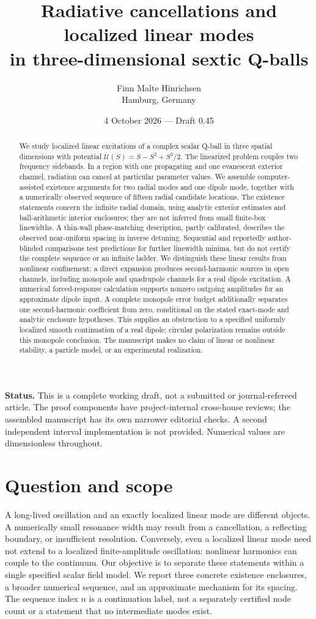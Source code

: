\documentclass[a4paper,11pt]{article}
\title{Radiative cancellations and localized linear modes\\in three-dimensional sextic Q-balls}
\author{Finn Malte Hinrichsen\\\small Hamburg, Germany}
\date{4 October 2026 --- Draft 0.45}
\begin{document}
\maketitle
\begin{abstract}
We study localized linear excitations of a complex scalar Q-ball in three
spatial dimensions with potential $\mathcal U(S)=S-S^2+S^3/2$.
The linearized problem couples two frequency sidebands. In a region with
one propagating and one evanescent exterior channel, radiation can cancel
at particular parameter values. We assemble computer-assisted existence
arguments for two radial modes and one dipole mode, together with a
numerically observed sequence of fifteen radial candidate locations.
The existence statements concern the infinite radial domain, using
analytic exterior estimates and ball-arithmetic interior enclosures;
they are not inferred from small finite-box linewidths. A thin-wall
phase-matching description, partly calibrated, describes the observed near-uniform
spacing in inverse detuning. Sequential and reportedly author-blinded comparisons
test predictions for further linewidth minima, but do not certify the complete sequence
or an infinite ladder. We distinguish these linear results from nonlinear
confinement: a direct expansion produces second-harmonic sources in open
channels, including monopole and quadrupole channels for a real dipole
excitation. A numerical forced-response calculation supports nonzero
outgoing amplitudes for an approximate dipole input. A complete monopole
error budget additionally separates one second-harmonic coefficient from
zero, conditional on the stated exact-mode and analytic enclosure
hypotheses. This supplies an obstruction to a specified uniformly
localized smooth continuation of a real dipole; circular polarization
remains outside this monopole conclusion. The
manuscript makes no claim of linear or nonlinear stability, a particle model, or an
experimental realization.
\end{abstract}
\noindent\textbf{Status.} This is a complete working draft, not a submitted or
journal-refereed article. The proof components have project-internal
cross-house reviews; the assembled manuscript has its own narrower
editorial checks. A second independent interval implementation is not
provided. Numerical values are dimensionless throughout.
\tableofcontents

\section{Question and scope}\label{sec:scope}
A long-lived oscillation and an exactly localized linear mode are different
objects. A numerically small resonance width may result from a cancellation,
a reflecting boundary, or insufficient resolution. Conversely, even a
localized linear mode need not extend to a localized finite-amplitude
oscillation: nonlinear harmonics can couple to the continuum.
Our objective is to separate these statements within a single specified
scalar field model. We report three concrete existence enclosures,
a broader numerical sequence, and an approximate mechanism for its spacing.
The sequence index $n$ is a continuation label, not a separately certified
node count or a statement that no intermediate modes exist.
\end{document}
